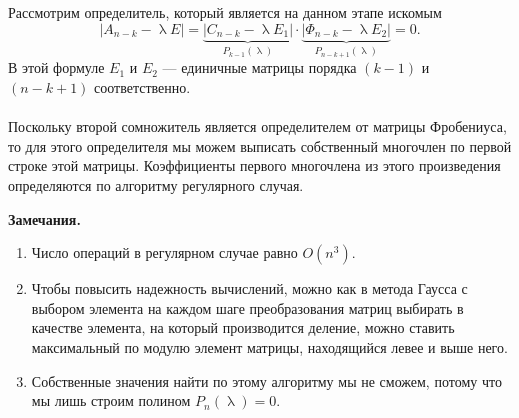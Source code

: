 \documentclass[a4paper, 12pt]{report}
\renewcommand{\lambda}{\uplambda}
\begin{document}
\begin{enumerate}
\begin{enumerate}
	 		Рассмотрим определитель, который является на данном этапе искомым $$|A_{n-k} - \lambda E| = \underbrace{|C_{n-k} - \lambda E_1|}_{P_{k-1}(\lambda)}\cdot \underbrace{| \Phi_{n-k} - \lambda E_2|}_{P_{n-k+1}(\lambda)} = 0.$$
	 		В этой формуле $E_1$ и  $E_2$ --- единичные матрицы порядка $(k-1)$ и $(n-k+1)$ соответственно. \\\\
	 		Поскольку второй сомножитель является определителем от матрицы Фробениуса, то для этого определителя мы можем выписать собственный многочлен по первой строке этой матрицы. Коэффициенты первого многочлена из этого произведения определяются по алгоритму регулярного случая. 
	 	\end{enumerate}
	 \end{enumerate}
	 \textbf{Замечания.}\begin{enumerate}
	 	\item Число операций в регулярном случае равно $O(n^3).$
	 	\item Чтобы повысить надежность вычислений, можно как в метода Гаусса с выбором элемента на каждом шаге преобразования матриц выбирать в качестве элемента, на который производится деление, можно ставить максимальный по модулю элемент матрицы, находящийся левее и выше него.
	 	\item Собственные значения найти по этому алгоритму мы не сможем, потому что мы лишь строим полином $P_n(\lambda) = 0.$
	 \end{enumerate} 
\end{document}
